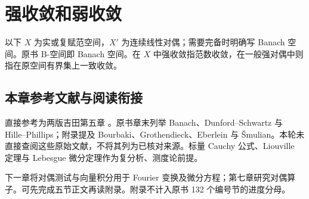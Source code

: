 \chapter{强收敛和弱收敛}\label{ch:yosida-05}

以下 $X$ 为实或复赋范空间，$X'$ 为连续线性对偶；需要完备时明确写 Banach 空间。原书 B-空间即 Banach 空间。在 $X$ 中强收敛指范数收敛，在一般强对偶中则指在原空间有界集上一致收敛。







\section*{本章参考文献与阅读衔接}
直接参考为两版吉田第五章 \cite{yosida-zh,yosida-en}。原书章末列举 Banach、Dunford--Schwartz 与 Hille--Phillips；附录提及 Bourbaki、Grothendieck、Eberlein 与 \v Smulian。本轮未直接查阅这些原始文献，不将其列为已核对来源。标量 Cauchy 公式、Liouville 定理与 Lebesgue 微分定理作为复分析、测度论前提。

下一章将对偶测试与向量积分用于 Fourier 变换及微分方程；第七章研究对偶算子。可先完成五节正文再读附录。附录不计入原书 132 个编号节的进度分母。

